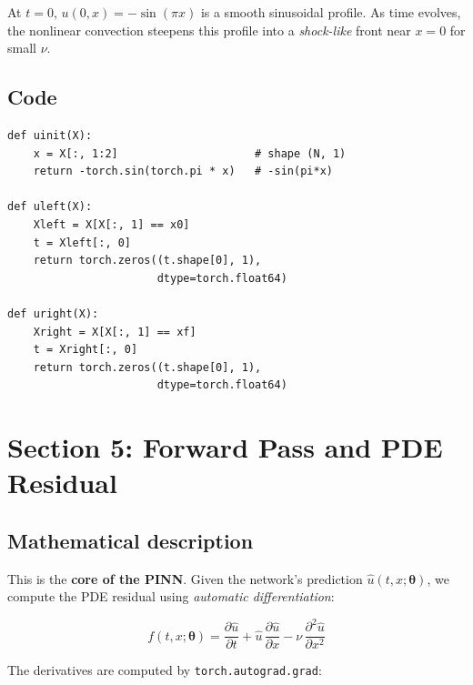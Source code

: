 \documentclass[11pt,a4paper]{article}
\begin{document}
At $t=0$, $u(0,x) = -\sin(\pi x)$ is a smooth sinusoidal profile.
As time evolves, the nonlinear convection steepens this profile
into a \emph{shock-like} front near $x=0$ for small $\nu$.

\subsection*{Code}

\begin{lstlisting}
def uinit(X):
    x = X[:, 1:2]                     # shape (N, 1)
    return -torch.sin(torch.pi * x)   # -sin(pi*x)

def uleft(X):
    Xleft = X[X[:, 1] == x0]
    t = Xleft[:, 0]
    return torch.zeros((t.shape[0], 1),
                       dtype=torch.float64)

def uright(X):
    Xright = X[X[:, 1] == xf]
    t = Xright[:, 0]
    return torch.zeros((t.shape[0], 1),
                       dtype=torch.float64)
\end{lstlisting}


\section{Section 5: Forward Pass and PDE Residual}
\label{sec:residual}

\subsection*{Mathematical description}

This is the \textbf{core of the PINN}.  Given the network's prediction
$\hat{u}(t,x;\bm\theta)$, we compute the PDE residual using
\emph{automatic differentiation}:

\begin{equation}
  f(t,x;\bm\theta) = \frac{\partial \hat{u}}{\partial t}
  + \hat{u}\,\frac{\partial \hat{u}}{\partial x}
  - \nu\,\frac{\partial^2 \hat{u}}{\partial x^2}
\label{eq:residual}
\end{equation}

The derivatives are computed by \texttt{torch.autograd.grad}:
\end{document}
